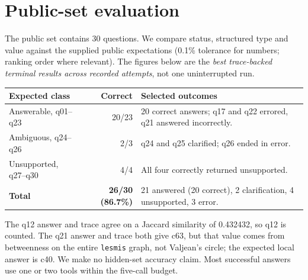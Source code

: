 \documentclass[10pt,a4paper]{article}
\newcommand{\tool}[1]{\texttt{#1}}
\begin{document}
\clearpage
\section{Public-set evaluation}
The public set contains 30 questions. We compare status, structured type and value against the supplied
public expectations (0.1\% tolerance for numbers; ranking order where relevant). The figures below are the
\emph{best trace-backed terminal results across recorded attempts}, not one uninterrupted run.

\begin{center}
\begin{tabularx}{0.93\linewidth}{@{}l r X@{}}
\toprule
Expected class & Correct & Selected outcomes \\
\midrule
Answerable, q01--q23 & 20/23 & 20 correct answers; q17 and q22 errored, q21 answered incorrectly. \\
Ambiguous, q24--q26 & 2/3 & q24 and q25 clarified; q26 ended in error. \\
Unsupported, q27--q30 & 4/4 & All four correctly returned unsupported. \\
\midrule
\textbf{Total} & \textbf{26/30 (86.7\%)} & 21 answered (20 correct), 2 clarification, 4 unsupported, 3 error. \\
\bottomrule
\end{tabularx}
\end{center}

The q12 answer and trace agree on a Jaccard similarity of 0.432432, so q12 is counted.
The q21 answer and trace both give c63, but that value comes from betweenness on the entire
\tool{lesmis} graph, not Valjean's circle; the expected local answer is c40. We make no
hidden-set accuracy claim. Most successful answers use one or two tools within the five-call budget.
\end{document}
